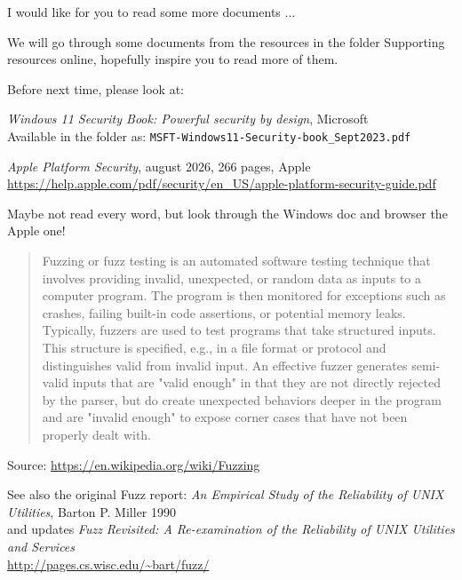 \documentclass[Screen16to9,17pt]{foils}
\begin{document}

I would like for you to read some more documents ...

We will go through some documents from the resources in the folder Supporting resources online, hopefully inspire you to read more of them.

Before next time, please look at:
\begin{list1}
\item  \emph{Windows 11 Security Book: Powerful security by design}, Microsoft \\
Available in the folder as: \verb+MSFT-Windows11-Security-book_Sept2023.pdf+
\item \emph{Apple Platform Security}, august 2026, 266 pages, Apple\\
\url{https://help.apple.com/pdf/security/en_US/apple-platform-security-guide.pdf}
\end{list1}

Maybe not read every word, but look through the Windows doc and browser the Apple one!



\begin{quote}
  Fuzzing or fuzz testing is an automated software testing technique that involves providing invalid, unexpected, or random data as inputs to a computer program. The program is then monitored for exceptions such as crashes, failing built-in code assertions, or potential memory leaks. Typically, fuzzers are used to test programs that take structured inputs. This structure is specified, e.g., in a file format or protocol and distinguishes valid from invalid input. An effective fuzzer generates semi-valid inputs that are "valid enough" in that they are not directly rejected by the parser, but do create unexpected behaviors deeper in the program and are "invalid enough" to expose corner cases that have not been properly dealt with.
\end{quote}
Source: \url{https://en.wikipedia.org/wiki/Fuzzing}

See also the original Fuzz report: \emph{An Empirical Study of the Reliability
of UNIX Utilities}, Barton P. Miller 1990\\
and updates \emph{Fuzz Revisited: A Re-examination of the Reliability
of UNIX Utilities and Services}\\
\url{http://pages.cs.wisc.edu/~bart/fuzz/}
\end{document}
